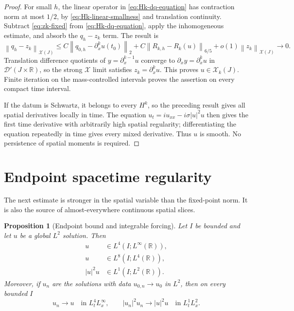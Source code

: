 \documentclass[11pt,oneside]{book}
\newtheorem{proposition}[theorem]{Proposition}
\theoremstyle{definition}
\theoremstyle{remark}
\newcommand{\R}{\mathbb R}
\newcommand{\D}{\mathcal D}
\newcommand{\1}{\mathbf 1}
\newcommand{\norm}[1]{\left\lVert #1\right\rVert}
\begin{document}
\begin{proof}
For small $h$, the linear operator in \eqref{eq:Hk-dq-equation} has
contraction norm at most $1/2$, by
\eqref{eq:Hk-linear-smallness} and translation continuity.  Subtract
\eqref{eq:zk-fixed} from \eqref{eq:Hk-dq-equation}, apply the inhomogeneous
estimate, and absorb the $q_h-z_k$ term.  The result is
\[
 \norm{q_h-z_k}_{\mathcal X(J)}
 \le C\norm{q_{0,h}-\partial_x^ku(t_0)}_2
   +C\norm{R_{k,h}-R_k(u)}_{6/5}
   +o(1)\norm{z_k}_{\mathcal X(J)}\longrightarrow0.
\]
Translation difference quotients of $y=\partial_x^{k-1}u$ converge to
$\partial_xy=\partial_x^ku$ in $\D'(J\times\R)$, so the strong
$\mathcal X$ limit satisfies $z_k=\partial_x^ku$.  This proves $u\in\mathcal X_k(J)$.  Finite iteration
on the mass-controlled intervals proves the assertion on every compact time
interval.

If the datum is Schwartz, it belongs to every $H^k$, so the preceding result
gives all spatial derivatives locally in time.  The equation
$u_t=i u_{xx}-i\sigma|u|^2u$ then gives the first time derivative with
arbitrarily high spatial regularity; differentiating the equation repeatedly
in time gives every mixed derivative.  Thus $u$ is smooth.  No persistence
of spatial moments is required.
\end{proof}

\section{Endpoint spacetime regularity}
The next estimate is stronger in the spatial variable than the fixed-point
norm.  It is also the source of almost-everywhere continuous spatial slices.

\begin{proposition}[Endpoint bound and integrable forcing]\label{prop:endpoint}
Let $I$ be bounded and let $u$ be a global $L^2$ solution.  Then
\begin{align}
 u&\in L^4(I;L^\infty(\R)),                         \label{eq:L4Linfty}\\
 u&\in L^8(I;L^4(\R)),                              \label{eq:L8L4}\\
 |u|^2u&\in L^1(I;L^2(\R)).                         \label{eq:forcing-L1L2}
\end{align}
Moreover, if $u_n$ are the solutions with data $u_{0,n}\to u_0$ in $L^2$,
then on every bounded $I$
\[
 u_n\to u\quad\text{in }L^4_tL^\infty_x,
 \qquad
 |u_n|^2u_n\to|u|^2u\quad\text{in }L^1_tL^2_x.
\]
\end{proposition}
\end{document}
